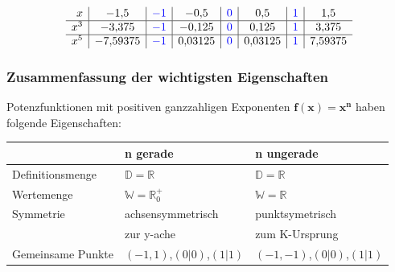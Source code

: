 \begin{multicols}{2}
    \[\begin{array}{r|c|c|c|c|c|c|c} x & -1{,}5 & {\color{blue}-1} & -0{,}5 & {\color{blue}0} & 0{,}5 & {\color{blue}1} & 1{,}5 \\ \hline x^3 & -3{,}375 & {\color{blue}-1} & -0{,}125 & {\color{blue}0} & 0{,}125 & {\color{blue}1} & 3{,}375 \\ \hline x^5 & -7{,}59375 & {\color{blue}-1} & 0{,}03125 & {\color{blue}0} & 0{,}03125 & {\color{blue}1} & 7{,}59375 \end{array}\]

    \subsubsection{Zusammenfassung der wichtigsten Eigenschaften}
    \vspace{-4mm}
    Potenzfunktionen mit positiven ganzzahligen Exponenten $\boldsymbol{f(x) = x^n}$ haben folgende Eigenschaften:
    \begin{tabular}{l|l|l}
                          & \textbf{n gerade}                 & \textbf{n ungerade}       \\ \hline
        Definitionsmenge  & $\mathbb{D} = \mathbb{R}$         & $\mathbb{D} = \mathbb{R}$ \\ \hline
        Wertemenge        & $\mathbb{W} = \mathbb{R}^{+}_{0}$ & $\mathbb{W} = \mathbb{R}$ \\ \hline
        Symmetrie         & achsensymmetrisch                 & punktsymetrisch           \\
                          & zur y-ache                        & zum K-Ursprung            \\ \hline
        Gemeinsame Punkte & $(-1,1)$,$(0|0)$,$(1|1)$          & $(-1,-1)$,$(0|0)$,$(1|1)$ \\ \hline
    \end{tabular}

\end{multicols}

